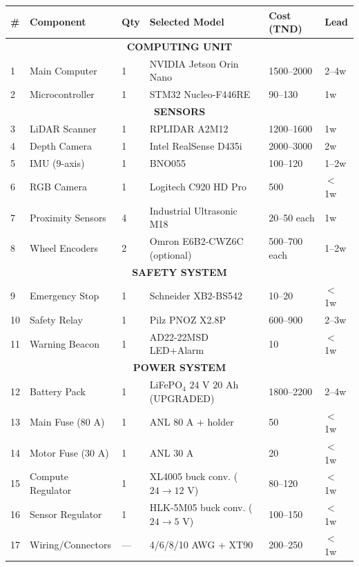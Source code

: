 \documentclass[12pt,a4paper]{article}
\begin{document}
\begin{longtable}{|p{1.2cm}|p{3.5cm}|p{1.5cm}|p{2cm}|p{1.5cm}|p{1cm}|}
\hline
\textbf{\#} & \textbf{Component} & \textbf{Qty} & \textbf{Selected Model} & \textbf{Cost (TND)} & \textbf{Lead} \\
\hline
\multicolumn{6}{|c|}{\textbf{COMPUTING UNIT}} \\
\hline
1 & Main Computer & 1 & NVIDIA Jetson Orin Nano & 1500--2000 & 2--4w \\
\hline
2 & Microcontroller & 1 & STM32 Nucleo-F446RE & 90--130 & 1w \\
\hline
\multicolumn{6}{|c|}{\textbf{SENSORS}} \\
\hline
3 & LiDAR Scanner & 1 & RPLIDAR A2M12 & 1200--1600 & 1w \\
\hline
4 & Depth Camera & 1 & Intel RealSense D435i & 2000--3000 & 2w \\
\hline
5 & IMU ($9$-axis) & 1 & BNO055 & 100--120 & 1--2w \\
\hline
6 & RGB Camera & 1 & Logitech C920 HD Pro & 500 & $<$1w \\
\hline
7 & Proximity Sensors & 4 & Industrial Ultrasonic M18 & 20--50 each & 1w \\
\hline
8 & Wheel Encoders & 2 & Omron E6B2-CWZ6C (optional) & 500--700 each & 1--2w \\
\hline
\multicolumn{6}{|c|}{\textbf{SAFETY SYSTEM}} \\
\hline
9 & Emergency Stop & 1 & Schneider XB2-BS542 & 10--20 & $<$1w \\
\hline
10 & Safety Relay & 1 & Pilz PNOZ X2.8P & 600--900 & 2--3w \\
\hline
11 & Warning Beacon & 1 & AD22-22MSD LED+Alarm & 10 & $<$1w \\
\hline
\multicolumn{6}{|c|}{\textbf{POWER SYSTEM}} \\
\hline
12 & Battery Pack & 1 & LiFePO$_4$ $24$ V $20$ Ah (UPGRADED) & 1800--2200 & 2--4w \\
\hline
13 & Main Fuse ($80$ A) & 1 & ANL $80$ A + holder & 50 & $<$1w \\
\hline
14 & Motor Fuse ($30$ A) & 1 & ANL $30$ A & 20 & $<$1w \\
\hline
15 & Compute Regulator & 1 & XL4005 buck conv. ($24 \to 12$ V) & 80--120 & $<$1w \\
\hline
16 & Sensor Regulator & 1 & HLK-5M05 buck conv. ($24 \to 5$ V) & 100--150 & $<$1w \\
\hline
17 & Wiring/Connectors & --- & 4/6/8/10 AWG + XT90 & 200--250 & $<$1w \\

\end{longtable}
\end{document}
